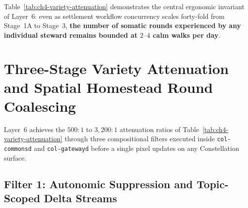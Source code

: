 \begin{table}[htbp]
\centering
\caption{Quantitative Cybernetic Variety Attenuation From Raw Layer~4 State Transitions to Calm Human Rounds}
\label{tab:ch4-variety-attenuation}
\small
{}
\end{table}

Table~\ref{tab:ch4-variety-attenuation} demonstrates the central ergonomic invariant of Layer~6: even as settlement workflow concurrency scales forty-fold from Stage~1A to Stage~3, \textbf{the number of somatic rounds experienced by any individual steward remains bounded at $2\text{--}4$ calm walks per day}.

\section{Three-Stage Variety Attenuation and Spatial Homestead Round Coalescing}
\label{sec:spatial-round-coalescing}

Layer~6 achieves the $500:1$ to $3{,}200:1$ attenuation ratios of Table~\ref{tab:ch4-variety-attenuation} through three compositional filters executed inside \texttt{col-commonsd} and \texttt{col-gatewayd} before a single pixel updates on any Constellation surface.

\subsection{Filter 1: Autonomic Suppression and Topic-Scoped Delta Streams}

